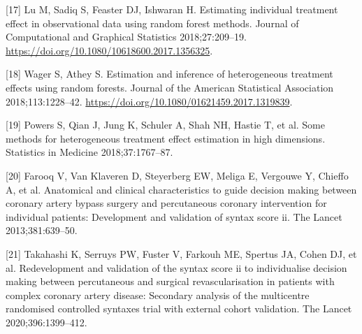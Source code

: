 \documentclass[]{elsarticle} %
\newenvironment{cslreferences}%
  {}%
  {\par}
\begin{document}
\begin{cslreferences}
\leavevmode\hypertarget{ref-Lu2018}{}%
{[}17{]} Lu M, Sadiq S, Feaster DJ, Ishwaran H. Estimating individual
treatment effect in observational data using random forest methods.
Journal of Computational and Graphical Statistics 2018;27:209--19.
\url{https://doi.org/10.1080/10618600.2017.1356325}.

\leavevmode\hypertarget{ref-Wager2018}{}%
{[}18{]} Wager S, Athey S. Estimation and inference of heterogeneous
treatment effects using random forests. Journal of the American
Statistical Association 2018;113:1228--42.
\url{https://doi.org/10.1080/01621459.2017.1319839}.

\leavevmode\hypertarget{ref-powers2018some}{}%
{[}19{]} Powers S, Qian J, Jung K, Schuler A, Shah NH, Hastie T, et al.
Some methods for heterogeneous treatment effect estimation in high
dimensions. Statistics in Medicine 2018;37:1767--87.

\leavevmode\hypertarget{ref-farooq2013anatomical}{}%
{[}20{]} Farooq V, Van Klaveren D, Steyerberg EW, Meliga E, Vergouwe Y,
Chieffo A, et al. Anatomical and clinical characteristics to guide
decision making between coronary artery bypass surgery and percutaneous
coronary intervention for individual patients: Development and
validation of syntax score ii. The Lancet 2013;381:639--50.

\leavevmode\hypertarget{ref-takahashi2020redevelopment}{}%
{[}21{]} Takahashi K, Serruys PW, Fuster V, Farkouh ME, Spertus JA,
Cohen DJ, et al. Redevelopment and validation of the syntax score ii to
individualise decision making between percutaneous and surgical
revascularisation in patients with complex coronary artery disease:
Secondary analysis of the multicentre randomised controlled syntaxes
trial with external cohort validation. The Lancet 2020;396:1399--412.
\end{cslreferences}

\setlength{\parindent}{0in}
\setlength{\leftskip}{0in}

\noindent
\end{document}
